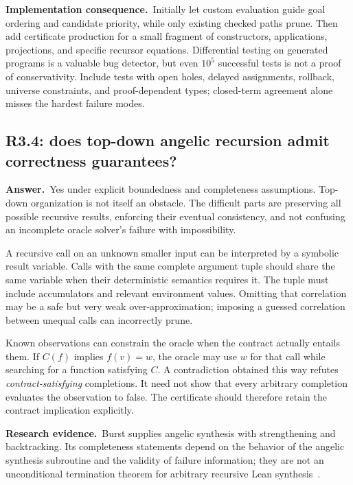 \documentclass[11pt,a4paper]{article}
\theoremstyle{definition}
\theoremstyle{remark}
\newcommand{\ans}{\noindent\textbf{Answer.}\ }
\newcommand{\imp}{\par\noindent\textbf{Implementation consequence.}\ }
\newcommand{\lit}{\par\noindent\textbf{Research evidence.}\ }
\begin{document}
\imp Initially let custom evaluation guide goal ordering and candidate
priority, while only existing checked paths prune. Then add certificate
production for a small fragment of constructors, applications, projections,
and specific recursor equations. Differential testing on generated programs
is a valuable bug detector, but even $10^5$ successful tests is not a proof of
conservativity. Include tests with open holes, delayed assignments, rollback,
universe constraints, and proof-dependent types; closed-term agreement alone
misses the hardest failure modes.

\subsection{R3.4: does top-down angelic recursion admit correctness guarantees?}\label{q:R3.4}
\ans Yes under explicit boundedness and completeness assumptions. Top-down
organization is not itself an obstacle. The difficult parts are preserving
all possible recursive results, enforcing their eventual consistency, and
not confusing an incomplete oracle solver's failure with impossibility.

A recursive call on an unknown smaller input can be interpreted by a symbolic
result variable. Calls with the same complete argument tuple should share the
same variable when their deterministic semantics requires it. The tuple must
include accumulators and relevant environment values. Omitting that correlation
may be a safe but very weak over-approximation; imposing a guessed correlation
between unequal calls can incorrectly prune.

Known observations can constrain the oracle when the contract actually entails
them. If $C(f)$ implies $f(v)=w$, the oracle may use $w$ for that call while
searching for a function satisfying $C$. A contradiction obtained this way
refutes \emph{contract-satisfying} completions. It need not show that every
arbitrary completion evaluates the observation to false. The certificate should
therefore retain the contract implication explicitly.

\lit Burst supplies angelic synthesis with strengthening and backtracking.
Its completeness statements depend on the behavior of the angelic synthesis
subroutine and the validity of failure information; they are not an
unconditional termination theorem for arbitrary recursive Lean synthesis~\cite{burst}.
\end{document}
